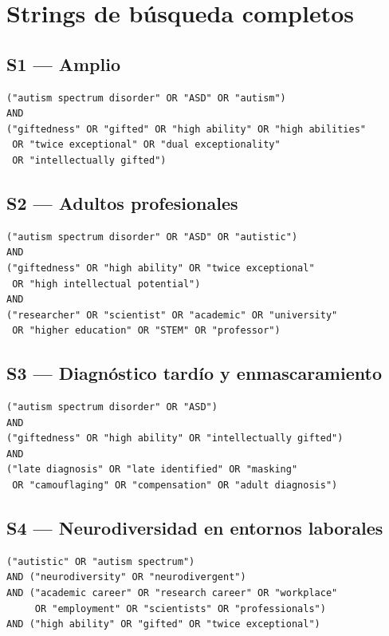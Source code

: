 \documentclass[12pt, a4paper]{article}
\begin{document}

\newpage
\printbibliography[title={Referencias}]


\newpage
\appendix

\section{Strings de búsqueda completos}
\label{app:strings}

\subsection*{S1 — Amplio}
\begin{verbatim}
("autism spectrum disorder" OR "ASD" OR "autism")
AND
("giftedness" OR "gifted" OR "high ability" OR "high abilities"
 OR "twice exceptional" OR "dual exceptionality"
 OR "intellectually gifted")
\end{verbatim}

\subsection*{S2 — Adultos profesionales}
\begin{verbatim}
("autism spectrum disorder" OR "ASD" OR "autistic")
AND
("giftedness" OR "high ability" OR "twice exceptional"
 OR "high intellectual potential")
AND
("researcher" OR "scientist" OR "academic" OR "university"
 OR "higher education" OR "STEM" OR "professor")
\end{verbatim}

\subsection*{S3 — Diagnóstico tardío y enmascaramiento}
\begin{verbatim}
("autism spectrum disorder" OR "ASD")
AND
("giftedness" OR "high ability" OR "intellectually gifted")
AND
("late diagnosis" OR "late identified" OR "masking"
 OR "camouflaging" OR "compensation" OR "adult diagnosis")
\end{verbatim}

\subsection*{S4 — Neurodiversidad en entornos laborales}
\begin{verbatim}
("autistic" OR "autism spectrum")
AND ("neurodiversity" OR "neurodivergent")
AND ("academic career" OR "research career" OR "workplace"
     OR "employment" OR "scientists" OR "professionals")
AND ("high ability" OR "gifted" OR "twice exceptional")
\end{verbatim}
\end{document}
